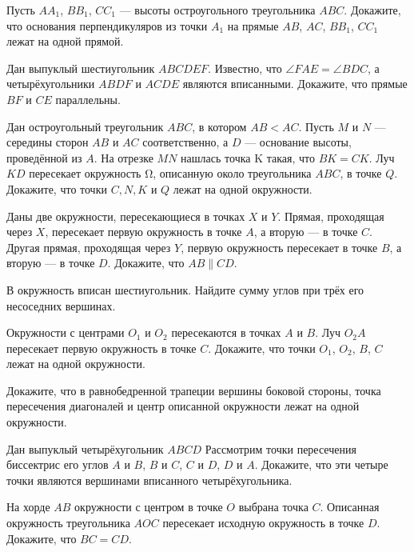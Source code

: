 \documentclass{article}
\begin{document}
\begin{enumerate_boxed}
        \item Пусть $AA_1$, $BB_1$, $CC_1$ — высоты остроугольного треугольника $ABC$.
        Докажите, что основания перпендикуляров из точки $A_1$ на прямые $AB$, $AC$, $BB_1$, $CC_1$ лежат на одной прямой.

        \item Дан выпуклый шестиугольник $ABCDEF$.
        Известно, что $\angle FAE = \angle BDC$, а четырёхугольники $ABDF$ и $ACDE$ являются вписанными.
        Докажите, что прямые $BF$ и $CE$ параллельны.

        \item Дан остроугольный треугольник $ABC$, в котором $AB < AC$.
        Пусть $M$ и $N$ — середины сторон $AB$ и $AC$ соответственно, а $D$ — основание высоты, проведённой из $A$.
        На отрезке $MN$ нашлась точка K такая, что $BK = CK$.
        Луч $KD$ пересекает окружность Ω, описанную около треугольника $ABC$, в точке $Q$.
        Докажите, что точки $C, N, K$ и $Q$ лежат на одной окружности.

        \item Даны две окружности, пересекающиеся в точках $X$ и $Y$.
        Прямая, проходящая через $X$, пересекает первую окружность в точке $A$, а вторую — в точке $C$.
        Другая прямая, проходящая через $Y$, первую окружность пересекает в точке $B$, а вторую — в точке $D$.
        Докажите, что $AB \parallel CD$.

        \item В окружность вписан шестиугольник.
        Найдите сумму углов при трёх его несоседних вершинах.

        \item Окружности с центрами $O_1$ и $O_2$ пересекаются в точках $A$ и $B$.
        Луч $O_{2}A$ пересекает первую окружность в точке $C$.
        Докажите, что точки $O_1$, $O_2$, $B$, $C$ лежат на одной окружности.

        \item Докажите, что в равнобедренной трапеции вершины боковой стороны, точка пересечения диагоналей и центр описанной окружности лежат на одной окружности.

        \item Дан выпуклый четырёхугольник $ABCD$ Рассмотрим точки пересечения биссектрис его углов $A$ и $B$, $B$ и $C$, $C$ и $D$, $D$ и $A$.
        Докажите, что эти четыре точки являются вершинами вписанного четырёхугольника.

        \item На хорде $AB$ окружности с центром в точке $O$ выбрана точка $C$.
        Описанная окружность треугольника $AOC$ пересекает исходную окружность в точке $D$.
        Докажите, что $BC=CD$.


\end{enumerate_boxed}
\end{document}
